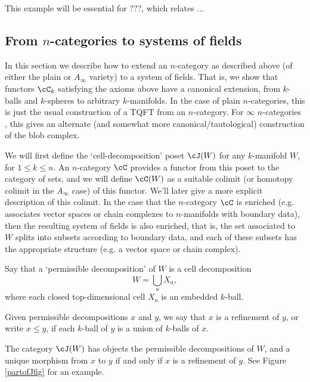 This example will be essential for ???, which relates ...

\begin{example}
\end{example}






\subsection{From $n$-categories to systems of fields}
\label{ss:ncat_fields}
In this section we describe how to extend an $n$-category as described above (of either the plain or $A_\infty$ variety) to a system of fields. That is, we show that functors $\cC_k$ satisfying the axioms above have a canonical extension, from $k$-balls and $k$-spheres to arbitrary $k$-manifolds.
In the case of plain $n$-categories, this is just the usual construction of a TQFT
from an $n$-category.
For $\infty$ $n$-categories , this gives an alternate (and
somewhat more canonical/tautological) construction of the blob complex.

We will first define the `cell-decomposition' poset $\cJ(W)$ for any $k$-manifold $W$, for $1 \leq k \leq n$. 
An $n$-category $\cC$ provides a functor from this poset to the category of sets, and we  will define $\cC(W)$ as a suitable colimit (or homotopy colimit in the $A_\infty$ case) of this functor. 
We'll later give a more explicit description of this colimit. In the case that the $n$-category $\cC$ is enriched (e.g. associates vector spaces or chain complexes to $n$-manifolds with boundary data), then the resulting system of fields is also enriched, that is, the set associated to $W$ splits into subsets according to boundary data, and each of these subsets has the appropriate structure (e.g. a vector space or chain complex).

\begin{defn}
Say that a `permissible decomposition' of $W$ is a cell decomposition
\[
	W = \bigcup_a X_a ,
\]
where each closed top-dimensional cell $X_a$ is an embedded $k$-ball.

Given permissible decompositions $x$ and $y$, we say that $x$ is a refinement
of $y$, or write $x \le y$, if each $k$-ball of $y$ is a union of $k$-balls of $x$.

The category $\cJ(W)$ has objects the permissible decompositions of $W$, and a unique morphism from $x$ to $y$ if and only if $x$ is a refinement of $y$.
See Figure \ref{partofJfig} for an example.
\end{defn}

